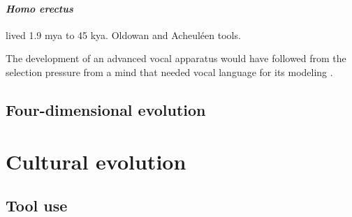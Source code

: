 \documentclass{article}
\begin{document}
\paragraph{\textit{Homo erectus}} lived 1.9 mya to 45 kya.
Oldowan and Acheuléen tools.

The development of an advanced vocal apparatus would have followed from the selection pressure from a mind that needed vocal language for its modeling \citep[p.220]{donald1991}.

\subsection{Four-dimensional evolution}

\citet{jablonka2007}


\section{Cultural evolution}
\label{sec:cultural_evolution}

\subsection{Tool use}
\label{sec:tool-use}





\end{document}
